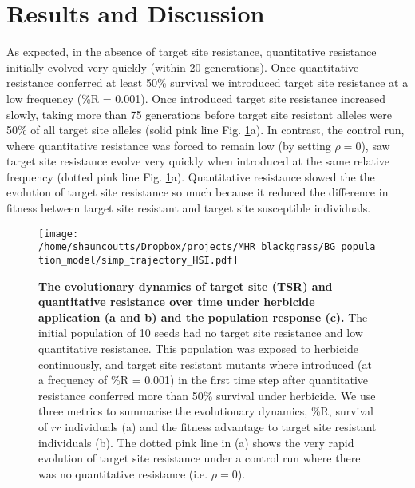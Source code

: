 \documentclass[10pt,letterpaper]{article}
\date{}
\begin{document}
\vspace*{0.2in}
\section*{Results and Discussion}
As expected, in the absence of target site resistance, quantitative resistance initially evolved very quickly (within 20 generations). Once quantitative resistance conferred at least 50\% survival we introduced target site resistance at a low frequency (\%R = 0.001). Once introduced target site resistance increased slowly, taking more than 75 generations before target site resistant alleles were 50\% of all target site alleles (solid pink line Fig. \ref{fig:simp_traj}a). In contrast, the control run, where quantitative resistance was forced to remain low (by setting $\rho = 0$), saw target site resistance evolve very quickly when introduced at the same relative frequency (dotted pink line Fig. \ref{fig:simp_traj}a). Quantitative resistance slowed the the evolution of target site resistance so much because it reduced the difference in fitness between target site resistant and target site susceptible individuals.      

\begin{figure}[!h] 
	\texttt{[image: /home/shauncoutts/Dropbox/projects/MHR\_blackgrass/BG\_population\_model/simp\_trajectory\_HSI.pdf]}
\caption{{\bf The evolutionary dynamics of target site (TSR) and quantitative resistance over time under herbicide application (a and b) and the population response (c).} The initial population of 10 seeds had no target site resistance and low quantitative resistance. This population was exposed to herbicide continuously, and target site resistant mutants where introduced (at a frequency of \%R = 0.001) in the first time step after quantitative resistance conferred more than 50\% survival under herbicide. We use three metrics to summarise the evolutionary dynamics, \%R, survival of $rr$ individuals (a) and the fitness advantage to target site resistant individuals (b). The dotted pink line in (a) shows the very rapid evolution of target site resistance under a control run where there was no quantitative resistance (i.e. $\rho = 0$).} 
\label{fig:simp_traj}
\end{figure}
\end{document}
